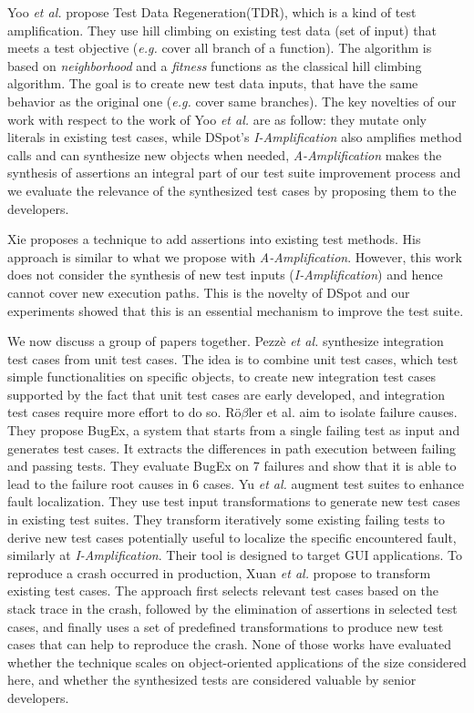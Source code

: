 \documentclass[table,xcdraw,smallextended]{svjour3}
\newcommand{\Iampl}{\emph{I-Amplification}\xspace}
\newcommand{\Aampl}{\emph{A-Amplification}\xspace}
\newcommand{\etal}{\textit{et al.}\xspace}
\newcommand{\eg}{\textit{e.g.}\xspace}
\newcommand{\dspot}{DSpot\xspace}
\begin{document}
Yoo \etal  \cite{Yoo:2012:TDR:2237756.2237758} propose Test Data Regeneration(TDR), which is a kind of test amplification. They use hill climbing on existing test data (set of input) that meets a test objective (\eg cover all branch of a function). The algorithm is based on \emph{neighborhood} and a \emph{fitness} functions as the classical hill climbing algorithm. The goal is to create new test data inputs, that have the same behavior as the original one (\eg cover same branches). 
The key novelties of our work with respect to the work of Yoo \etal \cite{Yoo:2012:TDR:2237756.2237758} are as follow: they mutate only literals in existing test cases, while \dspot's \Iampl also amplifies method calls and can synthesize new objects when needed, \Aampl{} makes the synthesis of assertions an integral part of our test suite improvement process and we evaluate the relevance of the synthesized test cases by proposing them to the developers.

Xie \cite{Xie2006} proposes a technique to add assertions into existing test methods. His approach is similar to what we propose with \Aampl{}. However, this work does not consider the synthesis of new test inputs (\Iampl) and hence cannot cover new execution paths. This is the novelty of \dspot and our experiments showed that this is an essential mechanism to improve the test suite.


We now discuss a group of papers together. Pezz\`e \etal \cite{Pezze:2013:GEI:2510665.2511580} synthesize integration test cases from unit test cases. The idea is to combine unit test cases, which test simple functionalities on specific objects, to create new integration test cases supported by the fact that unit test cases are early developed, and integration test cases require more effort to do so.
R{\"o}$\beta$ler et al. \cite{robetaler2012isolating} aim to isolate failure causes. They propose BugEx, a system that starts from a single failing test as input and generates test cases. It extracts the differences in path execution between failing and passing tests. They evaluate BugEx on 7 failures and show that it is able to lead to the failure root causes in 6 cases.
Yu \etal \cite{Yu2013} augment test suites to enhance fault localization. They use test input transformations to generate new test cases in existing test suites. They transform iteratively some existing failing tests to derive new test cases potentially useful to localize the specific encountered fault, similarly at \Iampl. Their tool is designed to target GUI applications.
To reproduce a crash occurred in production, Xuan \etal \cite{Xuan:2015:CRV:2786805.2803206} propose to transform existing test cases. The approach first selects relevant test cases based on the stack trace in the crash, followed by the elimination of assertions in selected test cases, and finally uses a set of predefined transformations to produce new test cases that can help to reproduce the crash.
None of those works have evaluated whether the technique scales on object-oriented applications of the size considered here, and whether the synthesized tests are considered valuable by senior developers.
\end{document}
